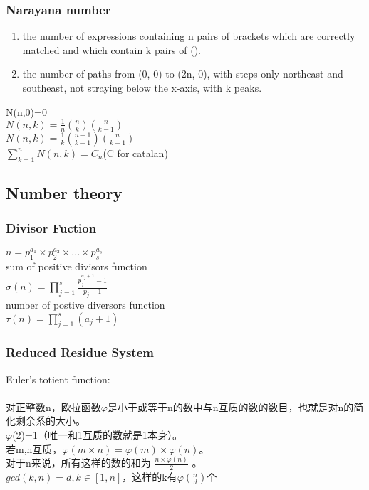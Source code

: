 \subsubsection{Narayana number}
\begin{enumerate}
\item the number of expressions containing n pairs of brackets which are correctly matched and which contain k pairs of ().
\item the number of paths from (0, 0) to (2n, 0), with steps only northeast and southeast, not straying below the x-axis, with k peaks.
\end{enumerate}
N(n,0)=0\\
$N(n,k)=\frac{1}{n}\binom{n}{k}\binom{n}{k-1}$\\
$N(n,k)=\frac{1}{k}\binom{n-1}{k-1}\binom{n}{k-1}$\\
$\sum\limits_{k=1}^nN(n,k)=C_n$(C for catalan)\\


\subsection{Number theory}
\subsubsection{Divisor Fuction}
$n=p_1^{a_1}\times p_2^{a_2}\times ... \times p_s^{a_s}$\\
sum of positive divisors function\\
$\sigma(n)=\prod\limits_{j=1}^s\frac{p_j^{a_j+1}-1}{p_j-1}$\\
number of postive diversors function\\
$\tau(n)=\prod\limits_{j=1}^s(a_j+1)$

\subsubsection{Reduced Residue System}
Euler's totient function:\\
\\
对正整数n，欧拉函数$\varphi$是小于或等于n的数中与n互质的数的数目，也就是对n的简化剩余系的大小。\\
 $\varphi$(2)=1（唯一和1互质的数就是1本身）。\\
若m,n互质，$\varphi (m\times n ) = \varphi (m ) \times \varphi (n )$。\\
对于n来说，所有这样的数的和为 $\frac{n\times\varphi (n )}{2}$ 。\\
$gcd(k,n)=d, k\in [1,n]$，这样的k有$\varphi(\frac{n}{d})个$\\\

